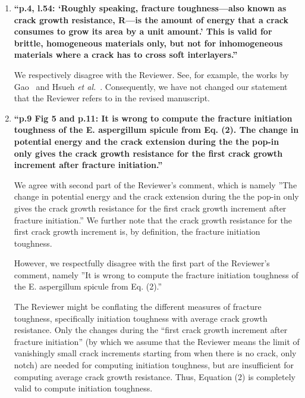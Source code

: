 \documentclass[11pt,letterpaper]{report}
\begin{document}
\begin{enumerate}[label=\textit{1.\arabic*},wide, labelwidth=!, labelindent=0pt]
\item \label{r1c7} {\bf ``p.4, l.54: `Roughly speaking, fracture toughness---also known as crack growth resistance, R---is the amount of energy that a crack consumes to grow its area by a unit amount.' This is valid for brittle, homogeneous materials only, but not for inhomogeneous materials where a crack has to cross soft interlayers.''}

We respectively disagree with the Reviewer. See, for example, the works by Gao~\cite{huajian1991fracture} and Hsueh \textit{et al.}~\cite{hsueh2018stress}. Consequently, we have not changed our statement that the Reviewer refers to in the revised manuscript.

\item \label{r1c8} {\bf ``p.9 Fig 5 and p.11: It is wrong to compute the fracture initiation toughness of the E. aspergillum spicule from Eq. (2). The change in potential energy and the crack extension during the the pop-in only gives the crack growth resistance for the first crack growth increment after fracture initiation.''}

We agree with second part of the Reviewer's comment, which is namely ''The change in potential energy and the crack extension during the the pop-in only gives the crack growth resistance for the first crack growth increment after fracture initiation.'' We further note that the crack growth resistance for the first crack growth increment is, by definition, the fracture initiation toughness.

However, we respectfully disagree with the first part of the Reviewer's comment, namely ''It is wrong to compute the fracture initiation toughness of the E. aspergillum spicule from Eq. (2).''

The Reviewer might be conflating the different measures of fracture toughness, specifically initiation toughness with average crack growth resistance.
Only the changes during the ``first crack growth increment after fracture initiation'' (by which we assume that the Reviewer means the limit of vanishingly small crack increments starting from when there is no crack, only notch)  are needed for computing initiation toughness, but are insufficient for computing average crack growth resistance. Thus,
Equation (2) is completely valid to compute initiation toughness.    


\end{enumerate}
\end{document}
